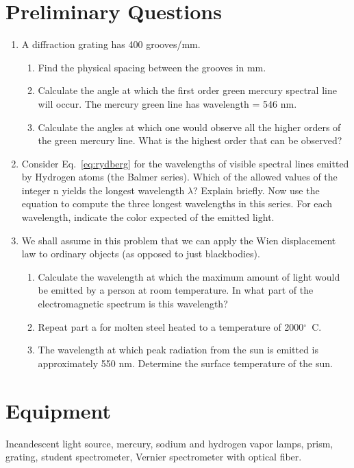 \section{Preliminary Questions}
\begin{enumerate}
\item A diffraction grating has 400 grooves/mm.
\begin{enumerate}
\item Find the physical spacing between the grooves in mm.
\item Calculate the angle at which the first order green mercury
spectral line will occur. The mercury green line has wavelength = 546
nm.
\item Calculate the angles at which one would observe all the higher
orders of the green mercury line. What is the highest order that can be
observed?
\end{enumerate}

\item Consider Eq.~\ref{eq:rydberg} for the wavelengths of visible spectral lines
emitted by Hydrogen atoms (the Balmer series). Which of the allowed
values of the integer n yields the longest wavelength ${\lambda}$?
Explain briefly. Now use the equation to compute the three longest
wavelengths in this series. For each wavelength, indicate the color
expected of the emitted light.

\item We shall assume in this problem that we can apply the Wien
displacement law to ordinary objects (as opposed to just blackbodies). 
\begin{enumerate}
\item Calculate the wavelength at which the maximum amount of light
would be emitted by a person at room temperature. In what part of the
electromagnetic spectrum is this wavelength?
\item Repeat part a for molten steel heated to a temperature of 2000$^\circ$~C.
\item The wavelength at which peak radiation from the sun is emitted is
approximately 550 nm. Determine the surface temperature of the sun.
\end{enumerate}
\end{enumerate}

\section{Equipment}
Incandescent light source, mercury, sodium and hydrogen
vapor lamps, prism, grating, student spectrometer, Vernier spectrometer with optical fiber.


